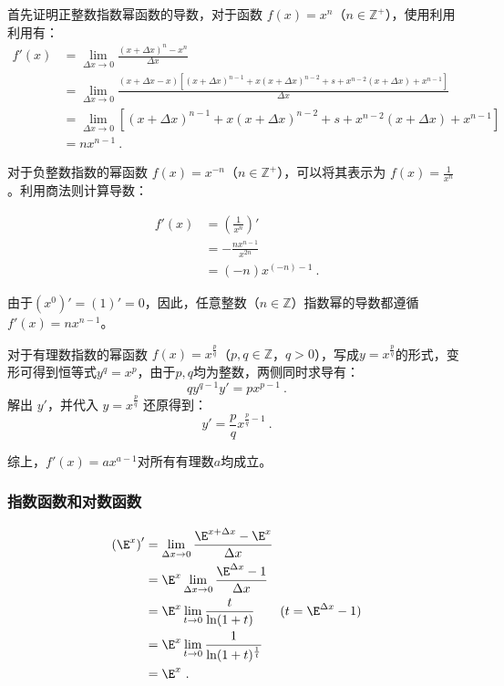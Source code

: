 首先证明正整数指数幂函数的导数，对于函数 $f(x) = x^n$（$n \in \mathbb{Z}^+$），使用利用利用有：
\begin{equation}
\begin{split}
f'(x) &= \lim_{\Delta x \to 0} \frac{(x+\Delta x)^n - x^n}{\Delta x}\\
&=\lim_{\Delta x \to 0} \frac{(x+\Delta x-x)[(x+\Delta x)^{n-1}+x(x+\Delta x)^{n-2}+s+x^{n-2}(x+\Delta x)+x^{n-1}]}{\Delta x}\\
&=\lim_{\Delta x \to 0} [(x+\Delta x)^{n-1}+x(x+\Delta x)^{n-2}+s+x^{n-2}(x+\Delta x)+x^{n-1}]\\
&=nx^{n-1}~.
\end{split}
\end{equation}

对于负整数指数的幂函数 $f(x) = x^{-n}$（$n \in \mathbb{Z}^+$），可以将其表示为 $f(x) = \frac{1}{x^{n}}$。利用商法则计算导数：

\begin{equation}
\begin{split}
f'(x) &= \left(\frac{1}{x^n}\right)' \\
&=-\frac{nx^{n-1}}{x^{2n}}\\
&=(-n)x^{(-n)-1}~.
\end{split}
\end{equation}

由于$(x^0)'=(1)'=0$，因此，任意整数（$n\in\mathbb{Z}$）指数幂的导数都遵循$f'(x) = nx^{n-1}$。

对于有理数指数的幂函数 $f(x) = x^{\frac{p}{q}}$（$p, q \in \mathbb{Z}$，$q > 0$），写成$y=x^{\frac{p}{q}}$的形式，变形可得到恒等式$y^q=x^p$，由于$p,q$均为整数，两侧同时求导有：
\begin{equation}
q  y^{q-1}  y' = p  x^{p-1}~.
\end{equation}
解出 $y'$，并代入 $\displaystyle y = x^{\frac{p}{q}}$ 还原得到：
\begin{equation}
y' =\frac{p}{q} x^{\frac{p}{q}-1}~.
\end{equation}

综上，$f'(x) = ax^{a-1}$对所有有理数$a$均成立。

\subsubsection{指数函数和对数函数}

\begin{equation}
\begin{split}
\left(\E^x\right)' &= \lim_{\Delta x \to 0}\frac{\E^{x+\Delta x}-\E^x}{\Delta x} \\
&= \E^x\lim_{\Delta x \to 0}\frac{\E^{\Delta x}-1}{\Delta x} \\
&= \E^x\lim_{t \to 0}\frac{t}{\ln(1+t)}\qquad(t=\E^{\Delta x}-1)\\
&= \E^x\lim_{t \to 0}\frac{1}{\ln(1+t)^{1\over t}}\\
&= \E^x~.
\end{split}
\end{equation}

